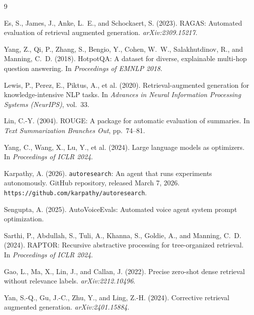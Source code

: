 \documentclass[11pt,a4paper]{article}
\begin{document}
\begin{thebibliography}{9}

Es, S., James, J., Anke, L.~E., and Schockaert, S. (2023).
RAGAS: Automated evaluation of retrieval augmented generation.
\textit{arXiv:2309.15217}.

Yang, Z., Qi, P., Zhang, S., Bengio, Y., Cohen, W.~W., Salakhutdinov, R., and
  Manning, C.~D. (2018).
HotpotQA: A dataset for diverse, explainable multi-hop question answering.
In \textit{Proceedings of EMNLP 2018}.

Lewis, P., Perez, E., Piktus, A., et al. (2020).
Retrieval-augmented generation for knowledge-intensive NLP tasks.
In \textit{Advances in Neural Information Processing Systems (NeurIPS)}, vol.~33.

Lin, C.-Y. (2004).
ROUGE: A package for automatic evaluation of summaries.
In \textit{Text Summarization Branches Out}, pp.\ 74--81.

Yang, C., Wang, X., Lu, Y., et al. (2024).
Large language models as optimizers.
In \textit{Proceedings of ICLR 2024}.

Karpathy, A. (2026).
\texttt{autoresearch}: An agent that runs experiments autonomously.
GitHub repository, released March 7, 2026.
\texttt{https://github.com/karpathy/autoresearch}.

Sengupta, A. (2025).
AutoVoiceEvals: Automated voice agent system prompt optimization.

Sarthi, P., Abdullah, S., Tuli, A., Khanna, S., Goldie, A., and Manning, C.~D.
(2024).
RAPTOR: Recursive abstractive processing for tree-organized retrieval.
In \textit{Proceedings of ICLR 2024}.

Gao, L., Ma, X., Lin, J., and Callan, J. (2022).
Precise zero-shot dense retrieval without relevance labels.
\textit{arXiv:2212.10496}.

Yan, S.-Q., Gu, J.-C., Zhu, Y., and Ling, Z.-H. (2024).
Corrective retrieval augmented generation.
\textit{arXiv:2401.15884}.

\end{thebibliography}
\end{document}
